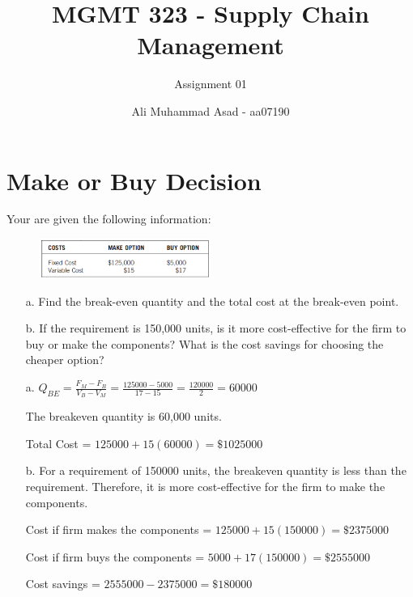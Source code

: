 \documentclass[addpoints]{exam}
\title{MGMT 323 - Supply Chain Management}
\author{Assignment 01}
\date{Ali Muhammad Asad - aa07190}
\begin{document}
\maketitle
\begin{sloppypar}
\section*{Make or Buy Decision}
\begin{questions}
    \question Your are given the following information:
    \begin{figure}[ht]
        \centering
        \includegraphics[width=0.5\textwidth]{q1.png}
    \end{figure}
    \begin{enumerate}
        \item[a.] Find the break-even quantity and the total cost at the break-even point.
        \item[b.] If the requirement is 150,000 units, is it more cost-effective for the firm to buy or make the components? What is the cost savings for choosing the cheaper option?
    \end{enumerate}
    \begin{solution}
        \begin{enumerate}
            \item[a.] $ Q_{BE} = \displaystyle\frac{F_M - F_B}{V_B - V_M} = \displaystyle\frac{125000 - 5000}{17 - 15} = \displaystyle\frac{120000}{2} = 60000 $
            
            The breakeven quantity is 60,000 units.
            
            Total Cost = $ 125000 + 15(60000) = \$1025000 $

            \item[b.] For a requirement of 150000 units, the breakeven quantity is less than the requirement. Therefore, it is more cost-effective for the firm to make the components.
            
            Cost if firm makes the components = $ 125000 + 15(150000) = \$2375000 $

            Cost if firm buys the components = $ 5000 + 17(150000) = \$2555000 $

            Cost savings = $ 2555000 - 2375000 = \$180000 $


\end{enumerate}
\end{solution}
\end{questions}
\end{sloppypar}
\end{document}
